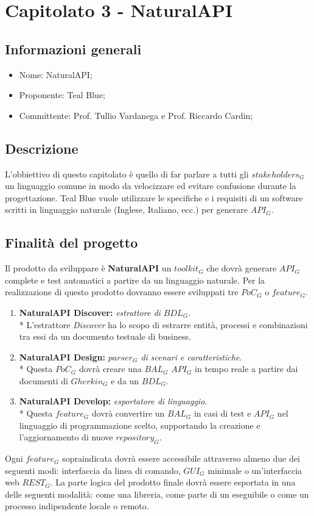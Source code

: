\section{Capitolato 3 - NaturalAPI}
\subsection{Informazioni generali}
\begin{itemize}
	\item Nome: NaturalAPI;
	\item Proponente: Teal Blue;
	\item Committente: Prof. Tullio Vardanega e Prof. Riccardo Cardin;
\end{itemize}
\subsection{Descrizione}
L'obbiettivo di questo capitolato è quello di far parlare a tutti gli $stakeholders_G$ un linguaggio comune in modo da velocizzare ed evitare confusione durante la progettazione. Teal Blue vuole utilizzare le specifiche e i requisiti di un software scritti in linguaggio naturale (Inglese, Italiano, ecc.) per generare $API_G$.
\subsection{Finalità del progetto}
Il prodotto da sviluppare è \textbf{NaturalAPI} un $toolkit_G$ che dovrà generare $API_G$ complete e test automatici a partire da un linguaggio naturale. Per la realizzazione di questo prodotto dovranno essere sviluppati tre $PoC_G$ o $feature_G$.
\begin{enumerate}
	\item \textbf{NaturalAPI Discover: }\textit{estrattore di $BDL_G$}. \\*
	L'estrattore \textit{Discover} ha lo scopo di estrarre entità, processi e combinazioni tra essi da un documento testuale di business.
	\item \textbf{NaturalAPI Design: }\textit{$parser_G$ di scenari e caratteristiche}. \\*
	Questa $PoC_G$ dovrà creare una $BAL_G$ $API_G$ in tempo reale a partire dai documenti di $Gherkin_G$ e da un $BDL_G$.
	\item \textbf{NaturalAPI Develop: }\textit{esportatore di linguaggio}. \\* 
	Questa $feature_G$ dovrà convertire un $BAL_G$ in casi di test e $API_G$ nel linguaggio di programmazione scelto, supportando la creazione e l'aggiornamento di nuove $repository_G$.
\end{enumerate} 
Ogni $feature_G$ sopraindicata dovrà essere accessibile attraverso almeno due dei seguenti modi: interfaccia da linea di comando, $GUI_G$ minimale o un'interfaccia web $REST_G$.
La parte logica del prodotto finale dovrà essere esportata in una delle seguenti modalità: come una libreria, come parte di un eseguibile o come un processo indipendente locale o remoto.  


